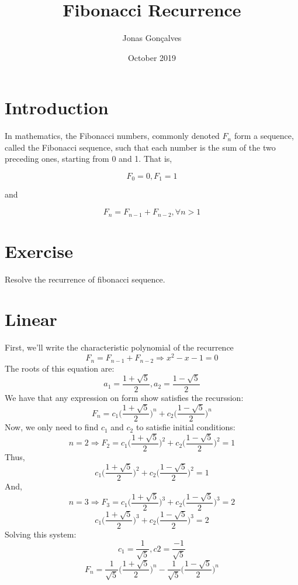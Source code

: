 \documentclass{article}
\title{Fibonacci Recurrence}
\author{Jonas Gonçalves}
\date{October 2019}
\begin{document}
\maketitle

\section{Introduction}
    In mathematics, the Fibonacci numbers, commonly denoted \(F_n\) form a sequence, called the Fibonacci sequence, such that each number is the sum of the two preceding ones, starting from 0 and 1. That is,

        \[F_0 = 0 , F_1 = 1\]
    
        \begin{center}
            and
        \end{center}
    
        \begin{equation}
            F_n = F_{n-1} + F_{n-2}, \forall n > 1
        \end{equation}

\section{Exercise}
    Resolve the recurrence of fibonacci sequence.
\section{Linear}
    First, we'll write the characteristic polynomial of the recurrence
    \[F_n = F_{n-1} + F_{n-2} \Longrightarrow x^2 - x - 1 = 0\]
    The roots of this equation are:
    \[a_1 = \frac{1+\sqrt{5}}{2}, a_2 = \frac{1-\sqrt{5}}{2}\]
    We have that any expression on form show satisfies the recurssion:
    \[F_n = c_1\bigg(\frac{1+\sqrt{5}}{2}\bigg)^n + c_2\bigg(\frac{1-\sqrt{5}}{2}\bigg)^n\]
    Now, we only need to find \(c_1\) and \(c_2\) to satisfie initial conditions:
    \[n = 2 \Longrightarrow F_2 = c_1\bigg(\frac{1+\sqrt{5}}{2}\bigg)^2 + c_2\bigg(\frac{1-\sqrt{5}}{2}\bigg)^2 = 1\]
    Thus,
    \[c_1\bigg(\frac{1+\sqrt{5}}{2}\bigg)^2 + c_2\bigg(\frac{1-\sqrt{5}}{2}\bigg)^2 = 1\]
    And,
    \[n = 3 \Longrightarrow F_3 = c_1\bigg(\frac{1+\sqrt{5}}{2}\bigg)^3 + c_2\bigg(\frac{1-\sqrt{5}}{2}\bigg)^3 = 2\]
    \[c_1\bigg(\frac{1+\sqrt{5}}{2}\bigg)^3 + c_2\bigg(\frac{1-\sqrt{5}}{2}\bigg)^3 = 2\]
    Solving this system:
    \[c_1 = \frac{1}{\sqrt{5}}, c2 = \frac{-1}{\sqrt{5}}\]
    \begin{equation}
        F_n = \frac{1}{\sqrt{5}}\bigg(\frac{1+\sqrt{5}}{2}\bigg)^n - \frac{1}{\sqrt{5}}\bigg(\frac{1-\sqrt{5}}{2}\bigg)^n
    \end{equation}
\end{document}
